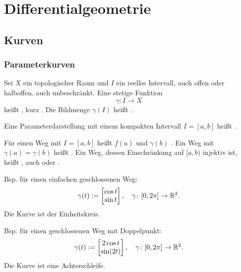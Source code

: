
\chapter{Differentialgeometrie}
\section{Kurven}
\subsection{Parameterkurven}

\begin{definition}
Sei $X$ ein topologischer Raum und
$I$ ein reelles Intervall, auch offen oder halboffen, auch unbeschränkt.
Eine stetige Funktion%
\begin{equation}\label{eq:Parameterkurve}
\gamma\colon I\to X
\end{equation}
heißt , kurz
. Die Bildmenge $\gamma(I)$ heißt .

Eine Parameterdarstellung mit einem kompakten Intervall $I=[a,b]$
heißt .

Für einen Weg mit $I=[a,b]$ heißt $f(a)$ 
und $\gamma(b)$ . Ein Weg mit $\gamma(a)=\gamma(b)$
heißt . Ein Weg, dessen Einschränkung auf $[a,b)$
injektiv ist, heißt , auch  oder
.
\end{definition}

\noindent
{}

Bsp. für einen einfachen geschlossenen Weg:
\begin{equation}
\gamma(t):=\begin{bmatrix}
\cos t\\
\sin t
\end{bmatrix},\quad
\gamma\colon [0,2\pi]\to \mathbb R^2.
\end{equation}
Die Kurve ist der Einheitskreis.

Bsp. für einen geschlossenen Weg mit Doppelpunkt:
\begin{equation}
\gamma(t):=\begin{bmatrix}
2\cos t\\
\sin(2t)
\end{bmatrix},\quad
\gamma\colon [0,2\pi]\to \mathbb R^2.
\end{equation}
Die Kurve ist eine Achterschleife.

